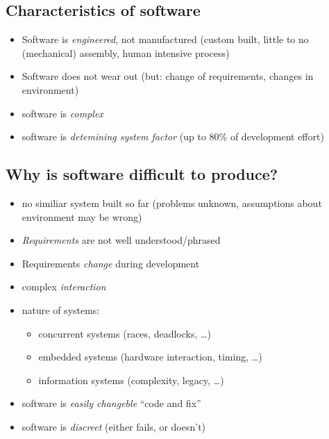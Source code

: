 \documentclass[a4paper, 10pt]{article}
\begin{document}
\subsection*{Characteristics of software}
\begin{itemize}
	\item Software is \emph{engineered}, not manufactured (custom built, little to no (mechanical) assembly, human intensive process)
	\item Software does not wear out (but: change of requirements, changes in environment)
	\item software is \emph{complex}
	\item software is \emph{detemining system factor} (up to 80\% of development effort)
\end{itemize}

\subsection*{Why is software difficult to produce?}
\begin{itemize}
	\item no similiar system built so far (problems unknown, assumptions about environment may be wrong)
	\item \emph{Requirements} are not well understood/phrased
	\item Requirements \emph{change} during development
	\item complex \emph{interaction}
	\item nature of systems:
		\begin{itemize}
			\item concurrent systems (races, deadlocks, \dots)
			\item embedded systems (hardware interaction, timing, \dots)
			\item information systems (complexity, legacy, \dots)
		\end{itemize}
	\item software is \emph{easily changeble} \follows ``code and fix''
	\item software is \emph{discreet} (either fails, or doesn't)
\end{itemize}
\end{document}

